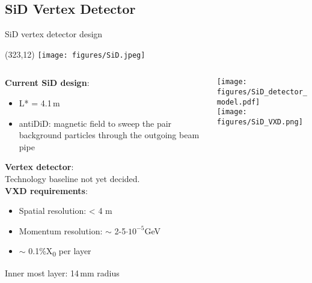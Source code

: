 \documentclass[xcolor={dvipsnames}]{beamer}
\newcommand{\sidlogo}{
  \setlength{\TPHorizModule}{1pt}
  \setlength{\TPVertModule}{1pt}
  \begin{textblock}{1}(323,12)
   \texttt{[image: figures/SiD.jpeg]}
  \end{textblock}
  }
\begin{document}
\subsection{SiD Vertex Detector}
\begin{frame}{SiD vertex detector design}
 \sidlogo
 \begin{columns}
  \begin{column}{0.6\textwidth}
 \textbf{\Large Current SiD design}:\\
  \vspace*{0.1cm}
  \begin{itemize}
   \item L* = 4.1\,m
   \item antiDiD: magnetic field to sweep the pair background particles through the outgoing beam pipe
  \end{itemize}
  \vspace*{0.5cm}
  \textbf{\Large Vertex detector}:\\
  \vspace*{0.2cm}
  Technology baseline not yet decided.\\
  \vspace*{0.1cm}
  \textbf{VXD requirements}:
  \begin{itemize}
   \item Spatial resolution: < 4 \textmu m\\
   \item Momentum resolution: $\sim$ 2-5$\cdot 10^{-5}$GeV\\
   \item $\sim$ 0.1\%X\textsubscript{0} per layer
  \end{itemize}
  \vspace*{0.1cm}
   Inner most layer: 14\,mm radius

  \end{column}
  \begin{column}{0.4\textwidth}
  \texttt{[image: figures/SiD\_detector\_model.pdf]}\\
   \texttt{[image: figures/SiD\_VXD.png]}
  \end{column}
 \end{columns}

\end{frame}
\end{document}

